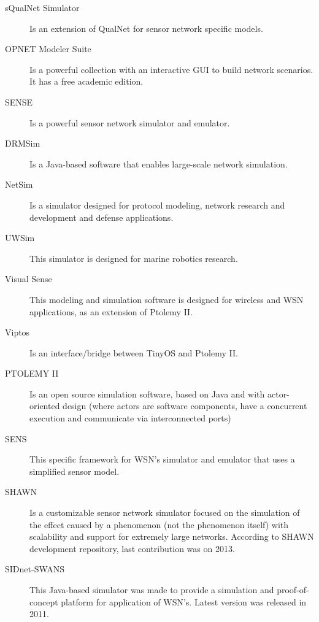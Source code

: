 \begin{description}
	\item [sQualNet Simulator] 
	Is an extension of QualNet for sensor network specific models. 

	\item [OPNET Modeler Suite] 
	Is a powerful collection with an interactive GUI to build network scenarios. It has a free academic edition. 

	\item [SENSE] 
	Is a powerful sensor network simulator and emulator.

	\item [DRMSim] 
	Is a Java-based software that enables large-scale network simulation.

	\item [NetSim] 
	Is a simulator designed for protocol modeling, network research and development and defense applications.

	\item [UWSim] 
	This simulator is designed for marine robotics research.

	\item [Visual Sense] 
	This modeling and simulation software is designed for wireless and WSN applications, as an extension of Ptolemy II.

	\item [Viptos] 
	Is an interface/bridge between TinyOS and Ptolemy II.

	\item [PTOLEMY II] 
	Is an open source simulation software, based on Java and with actor-oriented design (where actors are software components, have a concurrent execution and communicate via interconnected ports)
	
	\item [SENS] 
	This specific framework for WSN's simulator and emulator that uses a simplified sensor model.
	
	\item [SHAWN]	
	Is a customizable sensor network simulator focused on the simulation of the effect caused by a phenomenon (not the phenomenon itself) with scalability and support for extremely large networks. According to SHAWN development repository, last contribution was on 2013.
		
	\item [SIDnet-SWANS]
	This Java-based simulator was made to provide a simulation and proof-of-concept platform for application of WSN's.
	Latest version was released in 2011.
	

\end{description}
